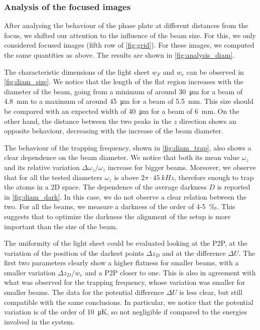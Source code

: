 \subsubsection{Analysis of the focused images}
After analysing the behaviour of the phase plate at different distances from the focus, we shifted our attention to the influence of the beam size. For this, we only considered focused images (fifth row of \cref{fig:grid}). For these images, we computed the same quantities as above.
The results are shown in \cref{fig:analysis_diam}.

The characteristic dimensions of the light sheet $w_F$ and $w_e$ can be observed in \cref{fig:diam_size}. We notice that  the length of the flat region increases with the diameter of the beam, going from a minimum of around \SI{30}{\micro m} for a beam of \SI{4.8}{mm} to a maximum of around \SI{45}{\micro m} for a beam of \SI{5.5}{mm}. This size should be compared with an expected width of \SI{40}{\micro m} for a beam of \SI{6}{mm}. On the other hand, the distance between the two peaks in the $z$ direction shows an opposite behaviour, decreasing with the increase of the beam diameter.

The behaviour of the trapping frequency, shown in \cref{fig:diam_trap}, also shows a clear dependence on the beam diameter. We notice that both its mean value $\omega_z$ and its relative variation $\Delta \omega_z / \omega_z$ increase for bigger beams. Moreover, we observe that for all the tested diameters $\omega_z$ is above $2\pi\cdot\SI{45}{kHz}$, therefore enough to trap the atoms in a 2D space. The dependence of the average darkness $D$ is reported in \cref{fig:diam_dark}. In this case, we do not observe a clear relation between the two. For all the beams, we measure a darkness of the order of 4-5~‰. This suggests that to optimize the darkness the alignment of the setup is more important than the size of the beam.

The uniformity of the light sheet could be evaluated looking at the P2P, at the variation of the position of the darkest points $\Delta z_D$ and at the difference $\Delta U$. The first two parameters clearly show a higher flatness for smaller beams, with a smaller variation $\Delta z_D / w_e$ and a P2P closer to one. This is also in agreement with what was observed for the trapping frequency, whose variation was smaller for smaller beams. The data for the potential difference $\Delta U$ is less clear, but still compatible with the same conclusions. In particular, we notice that the potential variation is of the order of \SI{10}{\micro K}, so not negligible if compared to the energies involved in the system.

